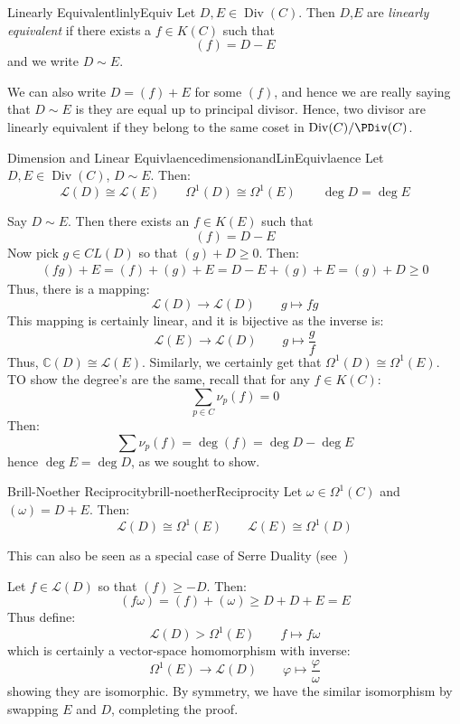 \documentclass{book}
\newcommand{\C}{{\mathbb{C}}}
\newcommand{\CL}{{\mathcal{L}}}
\newcommand{\Div}{{\operatorname{Div}}}
\let\temp\phi
\let\phi\varphi
\let\varphi\temp
\begin{document}
\begin{defn}{Linearly Equivalent}{linlyEquiv}
  Let $D,E \in \Div(C)$. Then $D$,$E$ are \emph{linearly equivalent} if there exists a $f \in K(C)$ such that
  \[
    (f) = D - E
  \]
  and we write $D \sim E$.
\end{defn}

We can also write $D = (f) + E$ for some $(f)$, and hence we are really saying that $D\sim E$ is they
are equal up to principal divisor. Hence, two divisor are linearly equivalent if they belong to the same coset
in $\Div(C)/\PDiv(C)$.

\begin{prop}{Dimension and Linear Equivlaence}{dimensionandLinEquivlaence}
  Let $D,E \in \Div(C)$, $D\sim E$. Then:
  \[
    \CL(D)\cong \CL(E) \qquad \Omega^1(D) \cong \Omega^1(E) \qquad \deg D = \deg E
  \]
\end{prop}

\begin{Proof}
  Say $D\sim E$. Then there exists an $f \in K(E)$ such that
  \[
    (f) = D-E
  \]
  Now pick $g \in CL(D)$ so that $(g) + D \ge 0$. Then:
  \begin{align*}
    (fg) + E = (f) + (g) + E = D-E+(g)+E = (g) + D \ge 0
  \end{align*}
  Thus, there is a mapping:
  \[
    \CL(D) \to \CL(D) \qquad g \mapsto fg
  \]
  This mapping is certainly linear, and it is bijective as the inverse is:
  \[
    \CL(E) \to \CL(D) \qquad g \mapsto \frac{g}{f}
  \]
  Thus, $\C(D) \cong \CL(E)$. Similarly, we certainly get that $\Omega^1(D) \cong \Omega^1(E)$. TO show the
  degree's are the same, recall that for any $ f\in K(C)$:
  \[
    \sum_{p \in C} \nu_p(f) = 0
  \]
  Then:
  \[
    \sum \nu_p(f) = \deg (f) = \deg D - \deg E
  \]
  hence $\deg E = \deg D$, as we sought to show.
\end{Proof}

\begin{prop}{Brill-Noether Reciprocity}{brill-noetherReciprocity}
  Let $\omega \in \Omega^1(C)$ and $(\omega) = D+E$. Then:
  \[
    \CL(D) \cong \Omega^1(E) \qquad \CL(E) \cong \Omega^1(D)
  \]
\end{prop}

This can also be seen as a special case of Serre Duality (see~\cite{NateAlgGeo})

\begin{Proof}
  Let $f \in \CL(D)$ so that $(f) \ge -D$. Then:
  \[
    (f\omega) = (f) + (\omega) \ge D +D +E  =E
  \]
  Thus define:
  \[
    \CL(D )> \Omega^1(E) \qquad f \mapsto f\omega
  \]
  which is certainly a vector-space homomorphism with inverse:
  \[
    \Omega^1(E) \to \CL(D) \qquad \phi \mapsto \frac{\phi}{\omega}
  \]
  showing they are isomorphic. By symmetry, we have the similar isomorphism by swapping $E$ and $D$,
  completing the proof.
\end{Proof}
\end{document}
